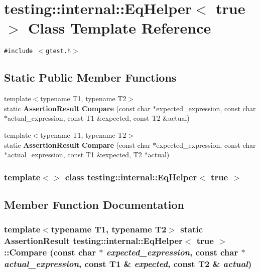 \section{testing::internal::EqHelper$<$ true $>$ Class Template Reference}
\label{classtesting_1_1internal_1_1EqHelper_3_01true_01_4}
{\tt \#include $<$gtest.h$>$}

\subsection*{Static Public Member Functions}
\begin{CompactItemize}
\item 
{\footnotesize template$<$typename T1, typename T2$>$ }\\static {\bf AssertionResult} {\bf Compare} (const char $\ast$expected\_\-expression, const char $\ast$actual\_\-expression, const T1 \&expected, const T2 \&actual)
\item 
{\footnotesize template$<$typename T1, typename T2$>$ }\\static {\bf AssertionResult} {\bf Compare} (const char $\ast$expected\_\-expression, const char $\ast$actual\_\-expression, const T1 \&expected, T2 $\ast$actual)
\end{CompactItemize}
\subsubsection*{template$<$$>$ class testing::internal::EqHelper$<$ true $>$}



\subsection{Member Function Documentation}
\subsubsection{\setlength{\rightskip}{0pt plus 5cm}template$<$typename T1, typename T2$>$ static {\bf AssertionResult} {\bf testing::internal::EqHelper}$<$ true $>$::Compare (const char $\ast$ {\em expected\_\-expression}, const char $\ast$ {\em actual\_\-expression}, const T1 \& {\em expected}, const T2 \& {\em actual})\hspace{0.3cm}{\tt  [inline, static]}}\label{classtesting_1_1internal_1_1EqHelper_3_01true_01_4_5282d5770e00c45f40ba4824425e230c}



